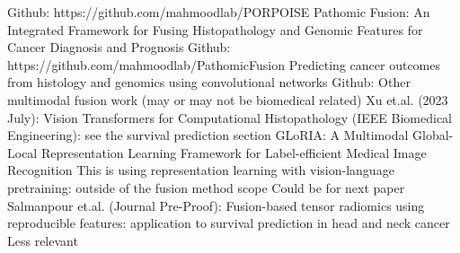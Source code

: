 \documentclass{article}%
\begin{document}
\newline%
\newline%
%
Github: https://github.com/mahmoodlab/PORPOISE %
\newline%
\newline%
%
%
\newline%
\newline%
%
Pathomic Fusion: An Integrated Framework for Fusing Histopathology and Genomic Features for Cancer Diagnosis and Prognosis%
\newline%
\newline%
%
Github: https://github.com/mahmoodlab/PathomicFusion  %
\newline%
\newline%
%
%
\newline%
\newline%
%
Predicting cancer outcomes from histology and genomics using convolutional networks%
\newline%
\newline%
%
Github: %
\newline%
\newline%
%
%
\newline%
\newline%
%
Other multimodal fusion work (may or may not be biomedical related) %
\newline%
\newline%
%
Xu et.al. (2023 July): Vision Transformers for Computational Histopathology (IEEE Biomedical Engineering): see the survival prediction section %
\newline%
\newline%
%
GLoRIA: A Multimodal Global{-}Local Representation Learning Framework for Label{-}efficient Medical Image Recognition%
\newline%
\newline%
%
This is using representation learning with vision{-}language pretraining: outside of the fusion method scope %
\newline%
\newline%
%
Could be for next paper %
\newline%
\newline%
%
Salmanpour et.al. (Journal Pre{-}Proof): Fusion{-}based tensor radiomics using reproducible features: application to survival prediction in head and neck cancer %
\newline%
\newline%
%
Less relevant %
\newline%
\newline%
\end{document}
